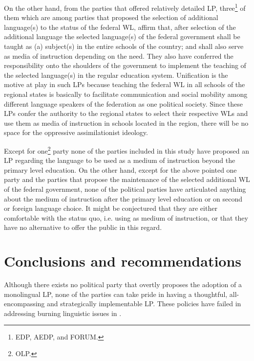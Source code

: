 \documentclass[output=paper,modfonts]{langscibook}
\begin{document}
On the other hand, from the parties that offered relatively detailed LP, three\footnote{EDP, AEDP, and FORUM.} of them which are among parties that proposed the selection of additional language(s) to the status of the federal WL, affirm that, after selection of the additional language the selected language(s) of the federal government shall be taught as (a) subject(s) in the entire schools of the country; and shall also serve as media of instruction depending on the need. They also have conferred the responsibility onto the shoulders of the government to implement the teaching of the selected language(s) in the regular education system.  Unification is the  motive at play in such LPs because teaching the federal WL in all schools of the regional states is basically to facilitate communication and social mobility among different language speakers of the federation as one political society. Since these LPs confer the authority to the regional states to select their respective WLs and use them as media of instruction in schools located in the region, there will be no space for the oppressive assimilationist ideology. 

Except for one\footnote{OLP.} party none of the parties included in this study have proposed an LP regarding the language to be used as a medium of instruction beyond the primary level education. On the other hand, except for the above pointed one party and the parties that propose the maintenance of the selected additional WL of the federal government, none of the political parties have articulated anything about the medium of instruction after the primary level education or on second or foreign language choice. It might be conjectured that they are either comfortable with the status quo, i.e. using  as medium of instruction, or that they have no alternative  to offer the public in this regard.
 
\section{Conclusions and recommendations} 
Although there exists no political party that overtly proposes the adoption of a monolingual LP, none of the parties can take pride in having a thoughtful, all-encompassing and strategically implementable LP. These policies have failed in addressing burning linguistic issues in .  
\end{document}
